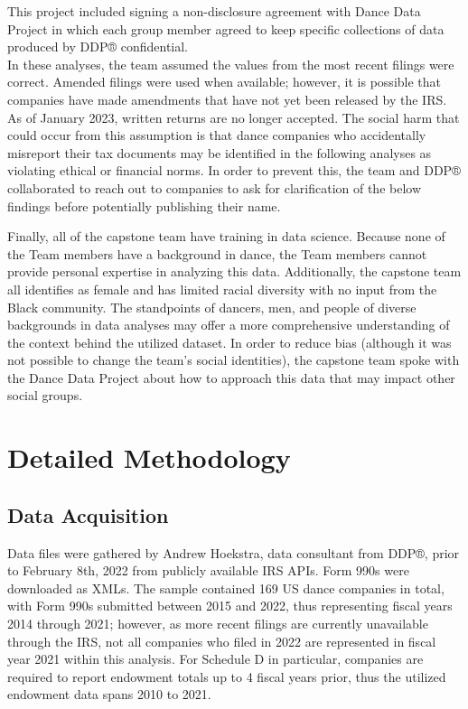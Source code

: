 \documentclass[Dance Data
Project,article,submit,moreauthors,pdftex]{mdpi}
\begin{document}
This project included signing a non-disclosure agreement with Dance Data
Project in which each group member agreed to keep specific collections
of data produced by DDP® confidential.\\
In these analyses, the team assumed the values from the most recent
filings were correct. Amended filings were used when available; however,
it is possible that companies have made amendments that have not yet
been released by the IRS. As of January 2023, written returns are no
longer accepted. The social harm that could occur from this assumption
is that dance companies who accidentally misreport their tax documents
may be identified in the following analyses as violating ethical or
financial norms. In order to prevent this, the team and DDP®
collaborated to reach out to companies to ask for clarification of the
below findings before potentially publishing their name.

Finally, all of the capstone team have training in data science. Because
none of the Team members have a background in dance, the Team members
cannot provide personal expertise in analyzing this data. Additionally,
the capstone team all identifies as female and has limited racial
diversity with no input from the Black community. The standpoints of
dancers, men, and people of diverse backgrounds in data analyses may
offer a more comprehensive understanding of the context behind the
utilized dataset. In order to reduce bias (although it was not possible
to change the team's social identities), the capstone team spoke with
the Dance Data Project about how to approach this data that may impact
other social groups.

\hypertarget{detailed-methodology}{%
\section{Detailed Methodology}\label{detailed-methodology}}

\hypertarget{data-acquisition}{%
\subsection{Data Acquisition}\label{data-acquisition}}

Data files were gathered by Andrew Hoekstra, data consultant from DDP®,
prior to February 8th, 2022 from publicly available IRS APIs. Form 990s
were downloaded as XMLs. The sample contained 169 US dance companies in
total, with Form 990s submitted between 2015 and 2022, thus representing
fiscal years 2014 through 2021; however, as more recent filings are
currently unavailable through the IRS, not all companies who filed in
2022 are represented in fiscal year 2021 within this analysis. For
Schedule D in particular, companies are required to report endowment
totals up to 4 fiscal years prior, thus the utilized endowment data
spans 2010 to 2021.
\end{document}
